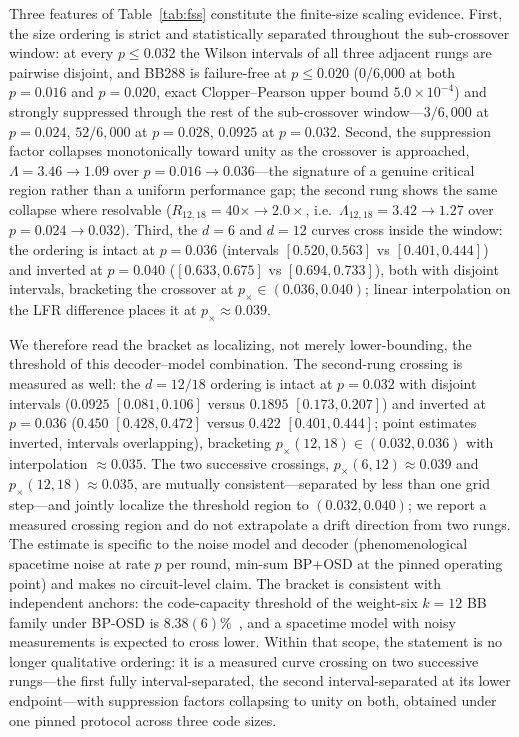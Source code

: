 \documentclass[pdflatex,sn-mathphys-num]{sn-jnl}
\theoremstyle{thmstyleone}
\theoremstyle{thmstyletwo}
\theoremstyle{thmstylethree}
\begin{document}
Three features of Table~\ref{tab:fss} constitute the finite-size scaling evidence. First, the size ordering is strict and statistically separated throughout the sub-crossover window: at every $p\le0.032$ the Wilson intervals of all three adjacent rungs are pairwise disjoint, and BB288 is failure-free at $p\le0.020$ (0/6{,}000 at both $p=0.016$ and $p=0.020$, exact Clopper--Pearson upper bound $5.0\times10^{-4}$) and strongly suppressed through the rest of the sub-crossover window---$3/6{,}000$ at $p=0.024$, $52/6{,}000$ at $p=0.028$, $0.0925$ at $p=0.032$. Second, the suppression factor collapses monotonically toward unity as the crossover is approached, $\Lambda=3.46\to1.09$ over $p=0.016\to0.036$---the signature of a genuine critical region rather than a uniform performance gap; the second rung shows the same collapse where resolvable ($R_{12,18}=40\times\to2.0\times$, i.e.\ $\Lambda_{12,18}=3.42\to1.27$ over $p=0.024\to0.032$). Third, the $d{=}6$ and $d{=}12$ curves cross inside the window: the ordering is intact at $p=0.036$ (intervals $[0.520,0.563]$ vs $[0.401,0.444]$) and inverted at $p=0.040$ ($[0.633,0.675]$ vs $[0.694,0.733]$), both with disjoint intervals, bracketing the crossover at $p_{\times}\in(0.036,0.040)$; linear interpolation on the LFR difference places it at $p_{\times}\approx0.039$.

We therefore read the bracket as localizing, not merely lower-bounding, the threshold of this decoder--model combination. The second-rung crossing is measured as well: the $d{=}12/18$ ordering is intact at $p=0.032$ with disjoint intervals ($0.0925$ $[0.081,0.106]$ versus $0.1895$ $[0.173,0.207]$) and inverted at $p=0.036$ ($0.450$ $[0.428,0.472]$ versus $0.422$ $[0.401,0.444]$; point estimates inverted, intervals overlapping), bracketing $p_{\times}(12,18)\in(0.032,0.036)$ with interpolation $\approx0.035$. The two successive crossings, $p_{\times}(6,12)\approx0.039$ and $p_{\times}(12,18)\approx0.035$, are mutually consistent---separated by less than one grid step---and jointly localize the threshold region to $(0.032,0.040)$; we report a measured crossing region and do not extrapolate a drift direction from two rungs. The estimate is specific to the noise model and decoder (phenomenological spacetime noise at rate $p$ per round, min-sum BP+OSD at the pinned operating point) and makes no circuit-level claim. The bracket is consistent with independent anchors: the code-capacity threshold of the weight-six $k{=}12$ BB family under BP-OSD is $8.38(6)\%$~\cite{English2026duality}, and a spacetime model with noisy measurements is expected to cross lower. Within that scope, the statement is no longer qualitative ordering: it is a measured curve crossing on two successive rungs---the first fully interval-separated, the second interval-separated at its lower endpoint---with suppression factors collapsing to unity on both, obtained under one pinned protocol across three code sizes.
\end{document}
